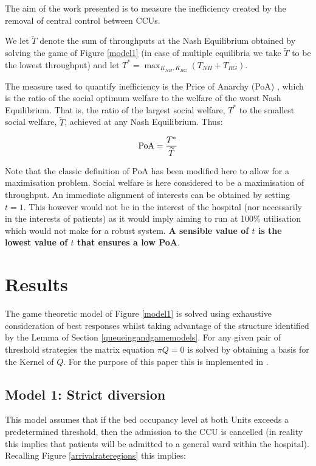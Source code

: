 \documentclass{article}
\begin{document}
The aim of the work presented is to measure the inefficiency created by the removal of central control between CCUs.

We let $\widetilde T$ denote the sum of throughputs at the Nash Equilibrium obtained by solving the game of Figure \ref{model1} (in case of multiple equilibria we take $\widetilde T$ to be the lowest throughput) and let $T^*=\max_{K_{NH}, K_{RG}}\left(T_{NH}+T_{RG}\right)$.

The measure used to quantify inefficiency is the Price of Anarchy (PoA) \cite{Koutsoupias1999,TimRoughgarden}, which is the ratio of the social optimum welfare to the welfare of the worst Nash Equilibrium.
That is, the ratio of the largest social welfare, $T^*$ to the smallest social welfare, $\widetilde{T}$, achieved at any Nash Equilibrium. Thus:

$$\text{PoA}={{T^*}\over{\widetilde{T}}}$$

Note that the classic definition of PoA has been modified here to allow for a maximisation problem.
Social welfare is here considered to be a maximisation of throughput.
An immediate alignment of interests can be obtained by setting $t=1$.
This however would not be in the interest of the hospital (nor necessarily in the interests of patients) as it would imply aiming to run at 100\% utilisation which would not make for a robust system.
\textbf{A sensible value of $t$ is the lowest value of $t$ that ensures a low PoA}.

\section{Results}\label{results}

The game theoretic model of Figure \ref{model1} is solved using exhaustive consideration of best responses whilst taking advantage of the structure identified by the Lemma of Section \ref{queueingandgamemodels}. For any given pair of threshold strategies the matrix equation $\pi Q=0$ is solved by obtaining a basis for the Kernel of $Q$. For the purpose of this paper this is implemented in \cite{sage}.

\subsection{Model 1: Strict diversion}

This model assumes that if the bed occupancy level at both Units exceeds a predetermined threshold, then the admission to the CCU is cancelled (in reality this implies that patients will be admitted to a general ward within the hospital).
Recalling Figure \ref{arrivalrateregions} this implies:
\end{document}
